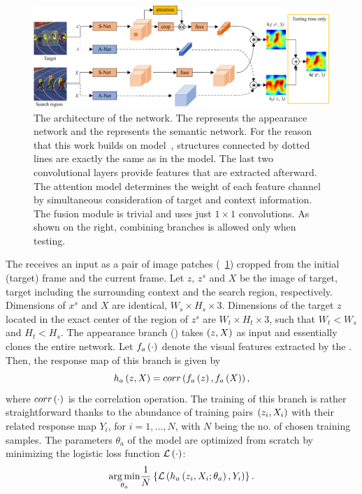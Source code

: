 \begin{figure}[t]
    \centerline{\includegraphics[width=\linewidth]{figures/theoretical_foundations/twofold_siamese_net_architecture.pdf}}
    \caption[ architecture]{The architecture of the  network. The  represents the appearance network and the  represents the semantic network. For the reason that this work builds on  model~\cite{bertinetto2016siamfc}, structures connected by dotted lines are exactly the same as in the  model. The last two convolutional layers provide features that are extracted afterward. The attention model determines the weight of each feature channel by simultaneous consideration of target and context information. The fusion module is trivial and uses just $1 \times 1$ convolutions. As shown on the right, combining branches is allowed only when testing. }
    \label{fig:TwofoldSiameseNetArchitecture}
\end{figure}

The  receives an input as a pair of image patches (\figstr{}~\ref{fig:TwofoldSiameseNetArchitecture}) cropped from the initial (target) frame and the current frame. Let $z$, $z^s$ and $X$ be the image of target, target including the surrounding context and the search region, respectively. Dimensions of $x^s$ and $X$ are identical, $W_s \times H_s \times 3$. Dimensions of the target $z$ located in the exact center of the region of $z^s$ are $W_t \times H_t \times 3$, such that $W_t < W_s$ and $H_t < H_s$. The appearance branch () takes $\left( {z, X} \right)$ as input and essentially clones the entire  network. Let ${f_a} \left( \cdot \right)$ denote the visual features extracted by the . Then, the response map of this branch is given by
\begin{equation}
    {h_a} \left( z, X \right) = {corr} \left( {f_a} \left( z \right), {f_a} \left( X \right) \right),
\end{equation}
where ${corr} \left( \cdot \right)$ is the correlation operation. The training of this branch is rather straightforward thanks to the abundance of training pairs $\left( {z_i, X_i} \right)$ with their related response map $Y_i$, for $i = 1, \dots, N$, with $N$ being the no. of chosen training samples. The parameters $\theta_a$ of the  model are optimized from scratch by minimizing the logistic loss function ${\mathcal{L}} \left( \cdot \right)$:
\begin{equation}
    \label{eq:ANetModelTraining}
    \underset{\theta_a}{\operatorname*{arg\,min}}
    \frac{1}{N}
    \left\{ {
        {\mathcal{L}} \left( 
            {h_a} \left( z_i, X_i; \theta_a \right),
            Y_i
         \right)
    } \right\}.
\end{equation}

